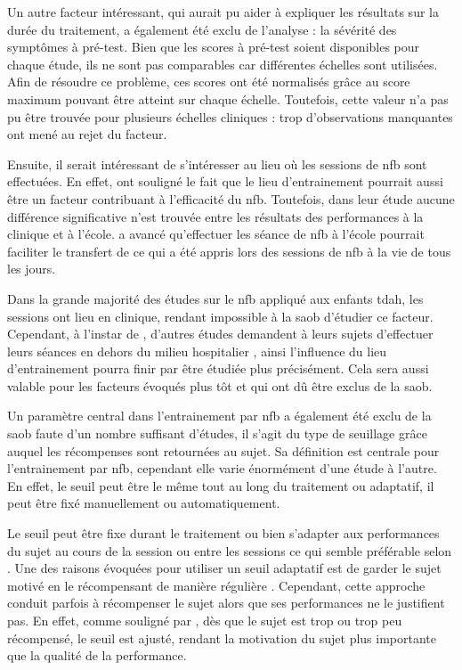Un autre facteur intéressant, qui aurait pu aider à expliquer les résultats sur la durée du traitement, a 
également été exclu de l'analyse : la sévérité des symptômes à pré-test. Bien que les scores à pré-test soient disponibles pour chaque étude, ils ne sont pas
comparables car différentes échelles sont utilisées. Afin de résoudre ce problème, ces scores ont été normalisés grâce au score maximum pouvant être atteint
sur chaque échelle. Toutefois, cette valeur n'a pas pu être trouvée pour plusieurs échelles cliniques : trop d'observations manquantes ont mené au rejet du facteur.

Ensuite, il serait intéressant de s'intéresser au lieu où les sessions de \gls{nfb} sont effectuées. En effet, \citet{Minder2018} ont souligné le fait que le lieu
d'entrainement pourrait aussi être un facteur contribuant à l'efficacité du \gls{nfb}. Toutefois, dans leur étude aucune différence significative 
n'est trouvée entre les résultats des performances à la clinique et à l'école. \citet{Vernon2004} a avancé qu'effectuer les séance de \gls{nfb} à l'école
pourrait faciliter le transfert de ce qui a été appris lors des sessions de \gls{nfb} à la vie de tous les jours.

Dans la grande majorité des études sur le \gls{nfb} appliqué aux enfants
\gls{tdah}, les sessions ont lieu en clinique, rendant impossible à la \gls{saob} d'étudier ce facteur. Cependant, à l'instar de \citet{Steiner2014, Minder2018}, 
d'autres études demandent à leurs sujets d'effectuer leurs séances en dehors du milieu hospitalier \citep{Bioulac2019}, ainsi l'influence du lieu d'entrainement 
pourra finir par être étudiée plus précisément. Cela sera aussi valable pour les facteurs évoqués plus tôt et qui ont dû être exclus de la \gls{saob}.

Un paramètre central dans l'entrainement par \gls{nfb} a également été exclu de la \gls{saob} faute d'un nombre suffisant d'études, il s'agit du type de seuillage 
grâce auquel les récompenses sont retournées au sujet. Sa définition est centrale pour l'entrainement par \gls{nfb}, cependant elle varie énormément d'une 
étude à l'autre. En effet, le seuil peut être le même tout au long du traitement ou adaptatif, il peut être fixé manuellement ou automatiquement. 

Le seuil peut être fixe durant le traitement ou bien s'adapter aux performances du sujet au cours de la session ou entre les sessions ce qui semble 
préférable selon \citep{Bauer2016}. Une des raisons évoquées pour utiliser un seuil adaptatif est de garder le sujet motivé en le récompensant de manière régulière 
\citep{Lansbergen2011}. Cependant, cette approche conduit parfois à récompenser le sujet alors que ses performances ne le justifient pas. En effet, comme souligné par \citep{Strehl2014},
dès que le sujet est trop ou trop peu récompensé, le seuil est ajusté, rendant la motivation du sujet plus importante que la qualité de la performance.


